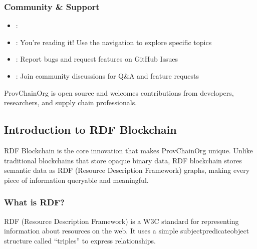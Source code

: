 \documentclass[letterpaper,10pt,english]{sphinxmanual}
\begin{document}
\subsubsection{Community \& Support}
\label{\detokenize{foundational/intro-to-provchainorg:community-support}}\begin{itemize}
\item {} 
\sphinxAtStartPar
{}: 

\item {} 
\sphinxAtStartPar
{}: You’re reading it! Use the navigation to explore specific topics

\item {} 
\sphinxAtStartPar
{}: Report bugs and request features on GitHub Issues

\item {} 
\sphinxAtStartPar
{}: Join community discussions for Q\&A and feature requests

\end{itemize}

\sphinxAtStartPar
ProvChainOrg is open source and welcomes contributions from developers, researchers, and supply chain professionals.

\sphinxstepscope


\subsection{Introduction to RDF Blockchain}
\label{\detokenize{foundational/intro-to-rdf-blockchain:introduction-to-rdf-blockchain}}\label{\detokenize{foundational/intro-to-rdf-blockchain::doc}}
\sphinxAtStartPar
RDF Blockchain is the core innovation that makes ProvChainOrg unique. Unlike traditional blockchains that store opaque binary data, RDF blockchain stores semantic data as RDF (Resource Description Framework) graphs, making every piece of information queryable and meaningful.


\subsubsection{What is RDF?}
\label{\detokenize{foundational/intro-to-rdf-blockchain:what-is-rdf}}
\sphinxAtStartPar
RDF (Resource Description Framework) is a W3C standard for representing information about resources on the web. It uses a simple subject\sphinxhyphen{}predicate\sphinxhyphen{}object structure called “triples” to express relationships.
\end{document}
